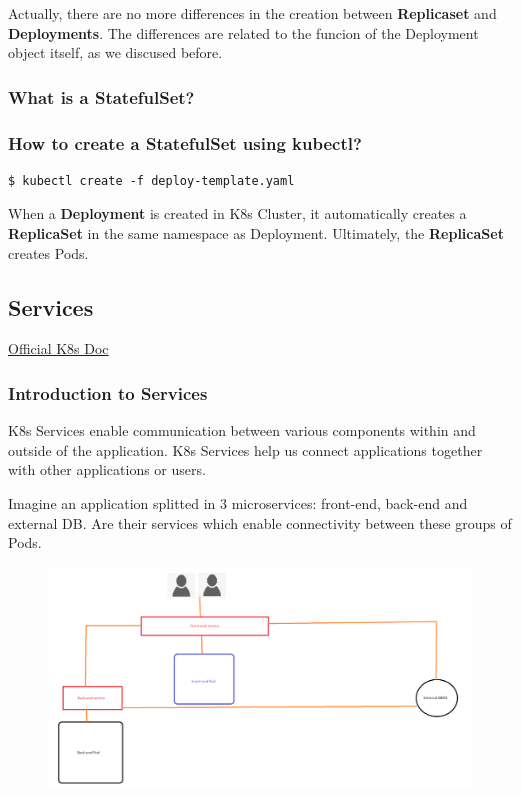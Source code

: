 \documentclass{article}
\newenvironment{blocktemplateII}[1]{%
    \tcolorbox[beamer,%
    noparskip,breakable,
    colframe=Green,%
    colbacklower=LimeGreen!75!LightGreen,%
    title=#1]}%
    {\endtcolorbox}
\newenvironment{codetemplate}[1][]{%
  \mybasecolorbox[#1]
  \itshape
}{%
  \endmybasecolorbox
}
\begin{document}
Actually, there are no more differences in the creation between \textbf{Replicaset} and \textbf{Deployments}. The differences are related to the funcion of the Deployment object itself, as we discused before.

\subsubsection{What is a StatefulSet?}

\subsubsection{How to create a StatefulSet using kubectl?}

\begin{codetemplate}{}
\begin{verbatim}
$ kubectl create -f deploy-template.yaml
\end{verbatim}
\end{codetemplate}

\begin{blocktemplateII}{NOTE}
When a \textbf{Deployment} is created in K8s Cluster, it automatically creates a \textbf{ReplicaSet} in the same namespace as Deployment. Ultimately, the \textbf{ReplicaSet} creates Pods.
\end{blocktemplateII}

\subsection{Services}

\href{https://kubernetes.io/docs/concepts/services-networking/service/}{Official K8s Doc}

\subsubsection{Introduction to Services}

 K8s Services enable communication between various components within and outside of the application. K8s Services help us connect applications together with other applications or users.

 Imagine an application splitted in 3 microservices: front-end, back-end and external DB. Are their services which enable connectivity between these groups of Pods.

 \begin{figure}[H]
    \centering
    \includegraphics[width=\textwidth]{pictures/services.png}
\end{figure}
\end{document}

